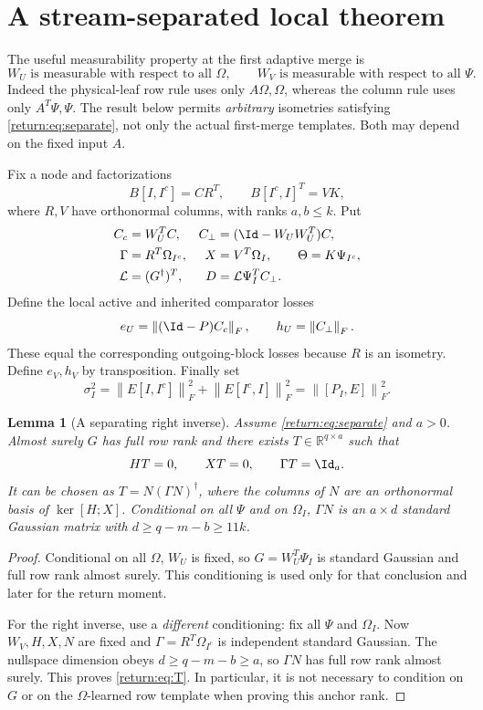 \documentclass[11pt,oneside,openany,a4paper]{book}
\numberwithin{equation}{chapter}
\newtheorem{lemma}[theorem]{Lemma}
\theoremstyle{definition}
\theoremstyle{remark}
\newcommand{\R}{\mathbb R}\newcommand{\E}{\mathbb E}\newcommand{\Prb}{\mathbb P}\newcommand{\PP}{\mathbb P}
\newcommand{\F}[1]{\left\lVert#1\right\rVert_F}
\begin{document}
\section{A stream-separated local theorem}
The useful measurability property at the first adaptive merge is
\begin{equation}\label{return:eq:separate}
 W_U\text{ is measurable with respect to all }\Omega,
 \qquad
 W_V\text{ is measurable with respect to all }\Psi.
\end{equation}
Indeed the physical-leaf row rule uses only $A\Omega,\Omega$, whereas the column rule uses only $A^T\Psi,\Psi$. The result below permits \emph{arbitrary} isometries satisfying \eqref{return:eq:separate}, not only the actual first-merge templates. Both may depend on the fixed input $A$.

Fix a node and factorizations
\[
 B[I,I^c]=CR^T,\qquad B[I^c,I]^T=VK,
\]
where $R,V$ have orthonormal columns, with ranks $a,b\le k$. Put
\begin{align*}
 C_c&=W_U^TC,& C_\perp&=(\Id-W_UW_U^T)C,\\
 \Gamma&=R^T\Omega_{I^c},& X&=V^T\Omega_I,\qquad
 \Theta=K\Psi_{I^c},\\
 \mathcal L&=(G^\dagger)^T,&D&=\mathcal L\Psi_I^TC_\perp.
\end{align*}
Define the local active and inherited comparator losses
\[
 e_U=\F{(\Id-P)C_c},\qquad h_U=\F{C_\perp}.
\]
These equal the corresponding outgoing-block losses because $R$ is an isometry. Define $e_V,h_V$ by transposition. Finally set
\begin{equation}\label{return:eq:cutenergy}
 \sigma_I^2=\F{E[I,I^c]}^2+\F{E[I^c,I]}^2
            =\F{[P_I,E]}^2.
\end{equation}

\begin{lemma}[A separating right inverse]\label{return:lem:separation}
Assume \eqref{return:eq:separate} and $a>0$. Almost surely $G$ has full row rank and there exists $T\in\R^{q\times a}$ such that
\begin{equation}\label{return:eq:T}
 HT=0,\qquad XT=0,\qquad\Gamma T=\Id_a.
\end{equation}
It can be chosen as $T=N(\Gamma N)^\dagger$, where the columns of $N$ are an orthonormal basis of $\ker[H;X]$. Conditional on all $\Psi$ and on $\Omega_I$, $\Gamma N$ is an $a\times d$ standard Gaussian matrix with $d\ge q-m-b\ge11k$.
\end{lemma}
\begin{proof}
Conditional on all $\Omega$, $W_U$ is fixed, so $G=W_U^T\Psi_I$ is standard Gaussian and full row rank almost surely. This conditioning is used only for that conclusion and later for the return moment.

For the right inverse, use a \emph{different} conditioning: fix all $\Psi$ and $\Omega_I$. Now $W_V,H,X,N$ are fixed and $\Gamma=R^T\Omega_{I^c}$ is independent standard Gaussian. The nullspace dimension obeys $d\ge q-m-b\ge a$, so $\Gamma N$ has full row rank almost surely. This proves \eqref{return:eq:T}. In particular, it is not necessary to condition on $G$ or on the $\Omega$-learned row template when proving this anchor rank.
\end{proof}
\end{document}
